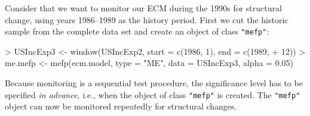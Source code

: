 \documentclass[10pt,a4paper]{article}
\begin{document}
Consider that we want to monitor our ECM during the
1990s for structural change, using years 1986--1989 as the history
period. First we cut the historic sample from the complete data set
and create an object of class \texttt{"mefp"}:
\begin{Schunk}
\begin{Sinput}
> USIncExp3 <- window(USIncExp2, start = c(1986, 1), end = c(1989, 
+     12))
> me.mefp <- mefp(ecm.model, type = "ME", data = USIncExp3, alpha = 0.05)
\end{Sinput}
\end{Schunk}
Because monitoring is a sequential test procedure, the
significance level has to be specified \emph{in advance}, i.e., when
the object of class \texttt{"mefp"} is created. The \texttt{"mefp"}
object can now be monitored repeatedly for structural changes.
\end{document}
